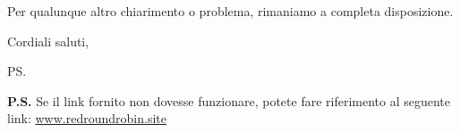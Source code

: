 \documentclass[12pt]{letter}
\begin{document}
\begin{letter}{ }

Per qualunque altro chiarimento o problema, rimaniamo a completa disposizione.

\closing{Cordiali saluti,}


\vspace{3em}
\ps

\textbf{P.S.} Se il link fornito non dovesse funzionare, potete fare riferimento al seguente link:
\href{https://www.redroundrobin.site}{www.redroundrobin.site}

\end{letter}
\end{document}
